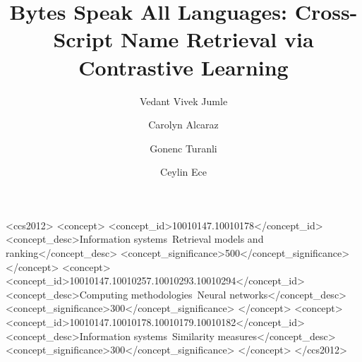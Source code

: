 \documentclass[sigconf]{acmart}
\begin{document}
\title[Bytes Speak All Languages: Cross-Script Name Retrieval via Contrastive Learning]{Bytes Speak All Languages: Cross-Script Name Retrieval via Contrastive Learning}

\renewcommand{\shortauthors}{Jumle et al.}

\author{Vedant Vivek Jumle}

\author{Carolyn Alcaraz}

\author{Gonenc Turanli}

\author{Ceylin Ece}

\begin{CCSXML}
<ccs2012>
 <concept>
  <concept_id>10010147.10010178</concept_id>
  <concept_desc>Information systems~Retrieval models and ranking</concept_desc>
  <concept_significance>500</concept_significance>
 </concept>
 <concept>
  <concept_id>10010147.10010257.10010293.10010294</concept_id>
  <concept_desc>Computing methodologies~Neural networks</concept_desc>
  <concept_significance>300</concept_significance>
 </concept>
 <concept>
  <concept_id>10010147.10010178.10010179.10010182</concept_id>
  <concept_desc>Information systems~Similarity measures</concept_desc>
  <concept_significance>300</concept_significance>
 </concept>
</ccs2012>
\end{CCSXML}


\end{document}
